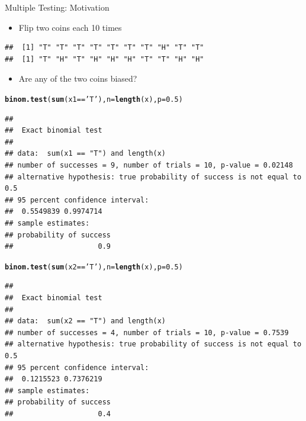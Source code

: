 \documentclass[xcolor=x11names,compress]{beamer}\usepackage[]{graphicx}\usepackage[]{color}
\makeatletter
\newcommand{\hlnum}[1]{\textcolor[rgb]{0.686,0.059,0.569}{#1}}%
\newcommand{\hlstr}[1]{\textcolor[rgb]{0.192,0.494,0.8}{#1}}%
\newcommand{\hlopt}[1]{\textcolor[rgb]{0,0,0}{#1}}%
\newcommand{\hlstd}[1]{\textcolor[rgb]{0.345,0.345,0.345}{#1}}%
\newcommand{\hlkwc}[1]{\textcolor[rgb]{0.333,0.667,0.333}{#1}}%
\newcommand{\hlkwd}[1]{\textcolor[rgb]{0.737,0.353,0.396}{\textbf{#1}}}%
\newenvironment{kframe}{%
 \def\at@end@of@kframe{}%
 \ifinner\ifhmode%
  \def\at@end@of@kframe{\end{minipage}}%
  \begin{minipage}{\columnwidth}%
 \fi\fi%
 \def\FrameCommand##1{\hskip\@totalleftmargin \hskip-\fboxsep
 \colorbox{shadecolor}{##1}\hskip-\fboxsep
     \hskip-\linewidth \hskip-\@totalleftmargin \hskip\columnwidth}%
 \MakeFramed {\advance\hsize-\width
   \@totalleftmargin\z@ \linewidth\hsize
   \@setminipage}}%
 {\par\unskip\endMakeFramed%
 \at@end@of@kframe}
\newenvironment{knitrout}{}{} %
\makeatother
\begin{document}
\begin{frame}[fragile]{Multiple Testing: Motivation}
  \begin{itemize}
  \item Flip two coins each 10 times
  \end{itemize}
\begin{knitrout}\tiny
{}\color{fgcolor}\begin{kframe}
\begin{verbatim}
##  [1] "T" "T" "T" "T" "T" "T" "T" "H" "T" "T"
##  [1] "T" "H" "T" "H" "H" "H" "T" "T" "H" "H"
\end{verbatim}
\end{kframe}
\end{knitrout}
\begin{itemize}
\item Are any of the two coins biased?
\end{itemize}
\begin{knitrout}\tiny
{}\color{fgcolor}\begin{kframe}
\begin{alltt}
\hlkwd{binom.test}\hlstd{(}\hlkwd{sum}\hlstd{(x1}\hlopt{==}\hlstr{'T'}\hlstd{),} \hlkwc{n}\hlstd{=}\hlkwd{length}\hlstd{(x),} \hlkwc{p} \hlstd{=} \hlnum{0.5}\hlstd{)}
\end{alltt}
\begin{verbatim}
## 
## 	Exact binomial test
## 
## data:  sum(x1 == "T") and length(x)
## number of successes = 9, number of trials = 10, p-value = 0.02148
## alternative hypothesis: true probability of success is not equal to 0.5
## 95 percent confidence interval:
##  0.5549839 0.9974714
## sample estimates:
## probability of success 
##                    0.9
\end{verbatim}
\begin{alltt}
\hlkwd{binom.test}\hlstd{(}\hlkwd{sum}\hlstd{(x2}\hlopt{==}\hlstr{'T'}\hlstd{),} \hlkwc{n}\hlstd{=}\hlkwd{length}\hlstd{(x),} \hlkwc{p} \hlstd{=} \hlnum{0.5}\hlstd{)}
\end{alltt}
\begin{verbatim}
## 
## 	Exact binomial test
## 
## data:  sum(x2 == "T") and length(x)
## number of successes = 4, number of trials = 10, p-value = 0.7539
## alternative hypothesis: true probability of success is not equal to 0.5
## 95 percent confidence interval:
##  0.1215523 0.7376219
## sample estimates:
## probability of success 
##                    0.4
\end{verbatim}
\end{kframe}
\end{knitrout}

\end{frame}
\end{document}
